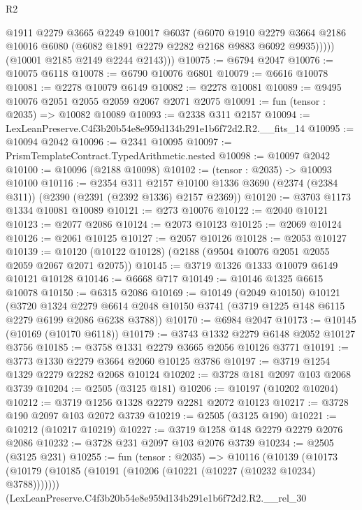 \begin{lexlean}{R2}
\begin{coremodule}
              @1911
              @2279
              @3665
              @2249
              @10017
              @6037
              (@6070
                @1910
                @2279
                @3664
                @2186
                @10016
                @6080
                (@6082 @1891 @2279 @2282 @2168 @9883 @6092 @9935)))))
        (@10001 @2185 @2149 @2244 @2143)))
@10075 := @6794 @2047
@10076 := @10075 @6118
@10078 := @6790 @10076 @6801
@10079 := @6616 @10078
@10081 := @2278 @10079 @6149
@10082 := @2278 @10081
@10089 := @9495 @10076 @2051 @2055 @2059 @2067 @2071 @2075
@10091 := fun (tensor : @2035) => @10082 @10089
@10093 := @2338 @311 @2157
@10094 := LexLeanPreserve.C4f3b20b54e8e959d134b291e1b6f72d2.R2.__fits_14
@10095 := @10094 @2042
@10096 := @2341 @10095
@10097 := PrismTemplateContract.TypedArithmetic.nested
@10098 := @10097 @2042
@10100 := @10096 (@2188 @10098)
@10102 := (tensor : @2035) -> @10093 @10100
@10116 := @2354
    @311
    @2157
    @10100
    @1336
    @3690
    (@2374 (@2384 @311))
    (@2390 (@2391 (@2392 @1336) @2157 @2369))
@10120 := @3703 @1173 @1334 @10081 @10089
@10121 := @273 @10076
@10122 := @2040 @10121
@10123 := @2077 @2086
@10124 := @2073 @10123
@10125 := @2069 @10124
@10126 := @2061 @10125
@10127 := @2057 @10126
@10128 := @2053 @10127
@10139 := @10120 (@10122 @10128) (@2188 (@9504 @10076 @2051 @2055 @2059 @2067 @2071 @2075))
@10145 := @3719 @1326 @1333 @10079 @6149 @10121 @10128
@10146 := @6668 @717
@10149 := @10146 @1325 @6615 @10078
@10150 := @6315 @2086
@10169 := @10149
    (@2049 @10150)
    @10121
    (@3720
      @1324
      @2279
      @6614
      @2048
      @10150
      @3741
      (@3719 @1225 @148 @6115 @2279 @6199 @2086 @6238 @3788))
@10170 := @6984 @2047
@10173 := @10145 (@10169 (@10170 @6118))
@10179 := @3743 @1332 @2279 @6148 @2052 @10127 @3756
@10185 := @3758 @1331 @2279 @3665 @2056 @10126 @3771
@10191 := @3773 @1330 @2279 @3664 @2060 @10125 @3786
@10197 := @3719 @1254 @1329 @2279 @2282 @2068 @10124
@10202 := @3728 @181 @2097 @103 @2068 @3739
@10204 := @2505 (@3125 @181)
@10206 := @10197 (@10202 @10204)
@10212 := @3719 @1256 @1328 @2279 @2281 @2072 @10123
@10217 := @3728 @190 @2097 @103 @2072 @3739
@10219 := @2505 (@3125 @190)
@10221 := @10212 (@10217 @10219)
@10227 := @3719 @1258 @148 @2279 @2279 @2076 @2086
@10232 := @3728 @231 @2097 @103 @2076 @3739
@10234 := @2505 (@3125 @231)
@10255 := fun (tensor : @2035) =>
  @10116
    (@10139
      (@10173 (@10179 (@10185 (@10191 (@10206 (@10221 (@10227 (@10232 @10234) @3788)))))))
      (LexLeanPreserve.C4f3b20b54e8e959d134b291e1b6f72d2.R2.__rel_30

\end{coremodule}
\end{lexlean}

